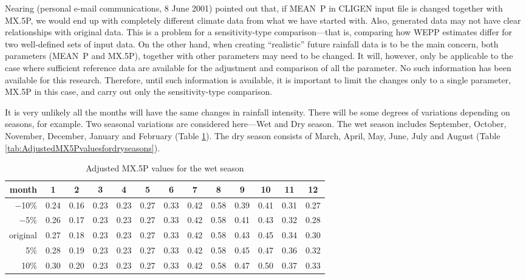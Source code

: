 Nearing (personal e-mail communications, 8 June 2001) pointed out that, if
MEAN~P in CLIGEN input file is changed together with {MX.5P}, we would end up
with completely different climate data from what we have started with. Also,
generated data may not have clear relationships with original data. This is a
problem for a sensitivity-type comparison---that is, comparing how WEPP
estimates differ for two well-defined sets of input data. On the other hand,
when creating ``realistic'' future rainfall data is to be the main concern, both
parameters (MEAN~P and {MX.5P}), together with other parameters may need to be
changed. It will, however, only be applicable to the case where sufficient
reference data are available for the adjustment and comparison of all the
parameter. No such information has been available for this research. Therefore,
until such information is available, it is important to limit the changes only
to a single parameter, {MX.5P} in this case, and carry out only the
sensitivity-type comparison.

It is very unlikely all the months will have the same changes in rainfall
intensity. There will be some degrees of variations depending on seasons, for
example. Two seasonal variations are considered here---Wet and Dry season. The
wet season includes September, October, November, December, January and February
(Table \ref{tab:AdjustedMX5Pvaluesforwetseasons}). The dry season consists of
March, April, May, June, July and August (Table
\ref{tab:AdjustedMX5Pvaluesfordryseasons}).

\begin{table}[htbp]
  \centering
  \footnotesize
  \caption{Adjusted {MX.5P} values for the wet season}
  \label{tab:AdjustedMX5Pvaluesforwetseasons}
    \begin{tabular}{r|cc|cccccc|cccc}
      \toprule
      month & \textbf{1} & \textbf{2} & 3 & 4 &5& 6& 7& 8& \textbf{9}
&\textbf{10}& \textbf{11}& \textbf{12}\\
      \midrule
      $-$10\% & 0.24 & 0.16 & 0.23 & 0.23&  0.27 & 0.33 & 0.42 & 0.58 & 0.39 &
0.41 & 0.31 & 0.27\\
      $-$5\%  &0.26 & 0.17 & 0.23 & 0.23 & 0.27 & 0.33 & 0.42 & 0.58 & 0.41 &
0.43 & 0.32 & 0.28\\
      original & 0.27 & 0.18 & 0.23  &0.23 & 0.27 & 0.33 &0.42 & 0.58 & 0.43 &
0.45 & 0.34 & 0.30\\
      5\% & 0.28 & 0.19 & 0.23 & 0.23 & 0.27 & 0.33 & 0.42& 0.58 & 0.45 & 0.47 &
0.36 & 0.32\\
      10\% & 0.30 & 0.20 & 0.23 & 0.23 & 0.27 & 0.33 & 0.42 & 0.58 & 0.47& 0.50
& 0.37 & 0.33\\
      \bottomrule
    \end{tabular}
\end{table}

